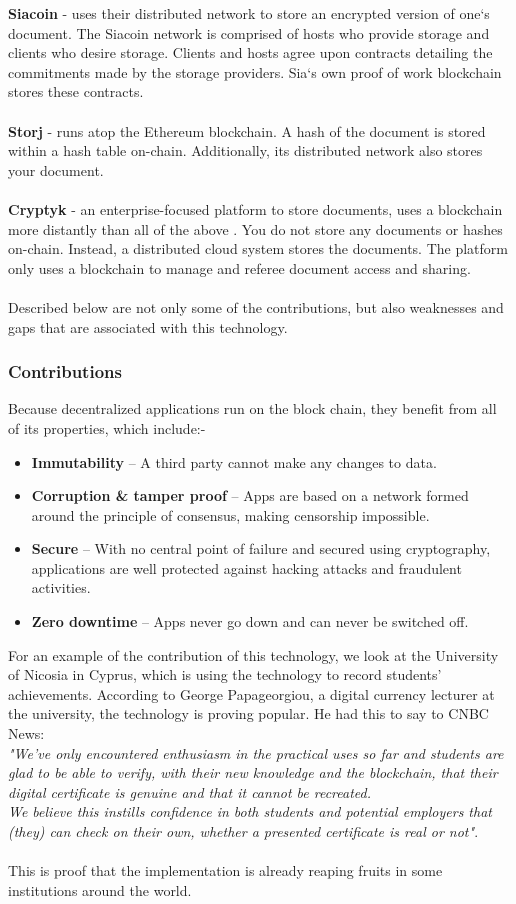 \textbf{Siacoin}\cite{art7} - uses their distributed network to store an encrypted version of one`s document. The Siacoin network is comprised of hosts who provide storage and clients who desire storage. Clients and hosts agree upon contracts detailing the commitments made by the storage providers. Sia`s own proof of work blockchain stores these contracts.\\\\
\textbf{Storj}\cite{art8} - runs atop the Ethereum blockchain. A hash of the document is stored within a hash table on-chain. Additionally, its distributed network also stores your document.\\\\
\textbf{Cryptyk}\cite{art9} - an enterprise-focused platform to store documents, uses a blockchain more distantly than all of the above	. You do not store any documents or hashes on-chain. Instead, a distributed cloud system stores the documents. The platform only uses a blockchain to manage and referee document access and sharing.\\\\
Described below are not only some of the contributions, but also weaknesses and gaps that are associated with this technology.
\subsubsection{Contributions}
Because decentralized applications run on the block chain, they benefit from all of its properties, which include:-\\
\begin{itemize}
\item \textbf{Immutability} – A third party cannot make any changes to data.
\item \textbf{Corruption \& tamper proof} – Apps are based on a network formed around the principle of consensus, making censorship impossible.
\item \textbf{Secure} – With no central point of failure and secured using cryptography, applications are well protected against hacking attacks and fraudulent activities.
\item \textbf{Zero downtime} – Apps never go down and can never be switched off.
\end{itemize}
For an example of the contribution of this technology, we look at the University of Nicosia in Cyprus, which is using the technology to record students' achievements. According to George Papageorgiou, a digital currency lecturer at the university, the technology is proving popular. He had this to say to CNBC News: \\ 
\textit{"We've only encountered enthusiasm in the practical uses so far and students are glad to be able to verify, with their new knowledge and the blockchain, that their digital certificate is genuine and that it cannot be recreated.\\
We believe this instills confidence in both students and potential employers that (they) can check on their own, whether a presented certificate is real or not"}.\cite{art10} \\ \\
This is proof that the implementation is already reaping fruits in some institutions around the world.

